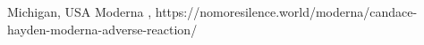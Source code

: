           {Michigan, USA}
          {}
          {Moderna}
          {, }
          {
          }
          {https://nomoresilence.world/moderna/candace-hayden-moderna-adverse-reaction/}

